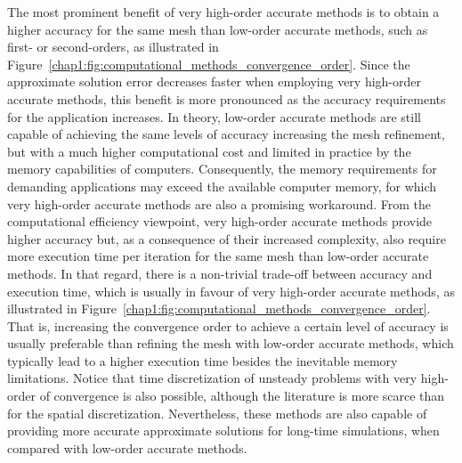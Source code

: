 The most prominent benefit of very high-order accurate methods is to obtain a higher accuracy for the same mesh than low-order accurate methods, such as first- or second-orders, as illustrated in Figure~\ref{chap1:fig:computational_methods_convergence_order}.
Since the approximate solution error decreases faster when employing very high-order accurate methods, this benefit is more pronounced as the accuracy requirements for the application increases.
In theory, low-order accurate methods are still capable of achieving the same levels of accuracy increasing the mesh refinement, but with a much higher computational cost and limited in practice by the memory capabilities of computers.
Consequently, the memory requirements for demanding applications may exceed the available computer memory, for which very high-order accurate methods are also a promising workaround.
From the computational efficiency viewpoint, very high-order accurate methods provide higher accuracy but, as a consequence of their increased complexity, also require more execution time per iteration for the same mesh than low-order accurate methods.
In that regard, there is a non-trivial trade-off between accuracy and execution time, which is usually in favour of very high-order accurate methods, as illustrated in Figure~\ref{chap1:fig:computational_methods_convergence_order}.
That is, increasing the convergence order to achieve a certain level of accuracy is usually preferable than refining the mesh with low-order accurate methods, which typically lead to a higher execution time besides the inevitable memory limitations.
Notice that time discretization of unsteady problems with very high-order of convergence is also possible, although the literature is more scarce than for the spatial discretization.
Nevertheless, these methods are also capable of providing more accurate approximate solutions for long-time simulations, when compared with low-order accurate methods.


